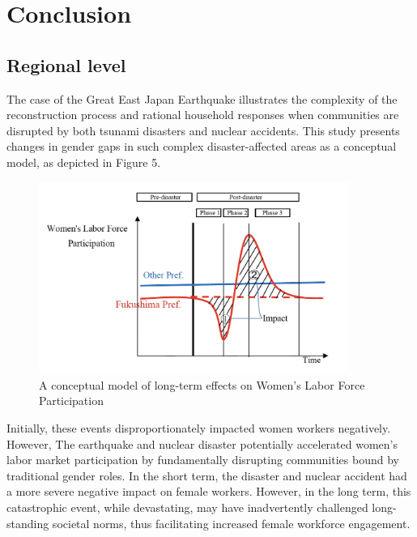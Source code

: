 \documentclass[12pt,halfline,a4paper]{ouparticle}
\begin{document}
\newpage

\section{Conclusion}
\label{sec5}

\subsection{Regional level}
\label{sec5.1}

The case of the Great East Japan Earthquake illustrates the complexity of the reconstruction process and rational household responses when communities are disrupted by both tsunami disasters and nuclear accidents. This study presents changes in gender gaps in such complex disaster-affected areas as a conceptual model, as depicted in Figure 5.

\begin{figure}[h!]
    \centering
    \includegraphics[width=0.9\textwidth]{A conceptual model.jpeg}  %
    \caption{A conceptual model of long-term effects on Women's Labor Force Participation}
    \label{fig:conceptual_model}
\end{figure}

Initially, these events disproportionately impacted women workers negatively. However, The earthquake and nuclear disaster potentially accelerated women's labor market participation by fundamentally disrupting communities bound by traditional gender roles. In the short term, the disaster and nuclear accident had a more severe negative impact on female workers. However, in the long term, this catastrophic event, while devastating, may have inadvertently challenged long-standing societal norms, thus facilitating increased female workforce engagement.
\end{document}

